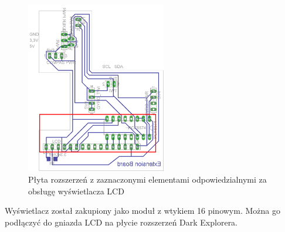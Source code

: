 \begin{figure}[!ht]
 \centering
 \includegraphics[height=75mm]{../images/ch04/extension_board-LCD.png}
 \caption{Płyta rozszerzeń z zaznaczonymi elementami odpowiedzialnymi za obsługę wyświetlacza LCD}
 \label{fig:ExBoardWithLCD}
\end{figure}

Wyświetlacz został zakupiony jako moduł z wtykiem 16 pinowym. Można go podłączyć do gniazda LCD na płycie rozszerzeń Dark Explorera.
